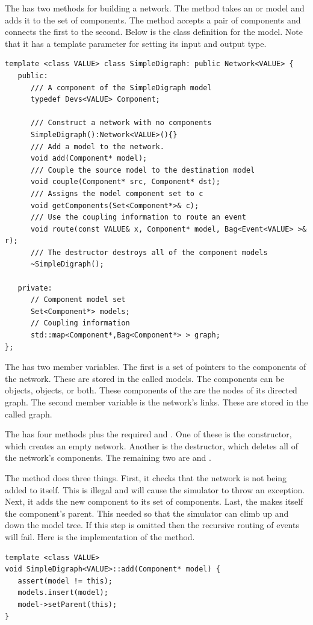 The  has two methods for building a network. The  method takes an  or  model and adds it to the set of components. The  method accepts a pair of components and connects the first to the second. Below is the class definition for the model. Note that it has a template parameter for setting its input and output type.
\begin{verbatim}
template <class VALUE> class SimpleDigraph: public Network<VALUE> {
   public:
      /// A component of the SimpleDigraph model
      typedef Devs<VALUE> Component;

      /// Construct a network with no components
      SimpleDigraph():Network<VALUE>(){}
      /// Add a model to the network.
      void add(Component* model);
      /// Couple the source model to the destination model
      void couple(Component* src, Component* dst);
      /// Assigns the model component set to c
      void getComponents(Set<Component*>& c);
      /// Use the coupling information to route an event
      void route(const VALUE& x, Component* model, Bag<Event<VALUE> >& r);
      /// The destructor destroys all of the component models
      ~SimpleDigraph();

   private:
      // Component model set
      Set<Component*> models;
      // Coupling information
      std::map<Component*,Bag<Component*> > graph;
};
\end{verbatim}
The  has two member variables. The first is a set of pointers to the components of the network. These are stored in the  called models. The components can be  objects,  objects, or both. These components of the  are the nodes of its directed graph. The second member variable is the network's links. These are stored in the  called graph.

The  has four methods plus the required  and . One of these is the constructor, which creates an empty network. Another is the destructor, which deletes all of the network's components. The remaining two are  and .

The  method does three things. First, it checks that the network is not being added to itself. This is illegal and will cause the simulator to throw an exception. Next, it adds the new component to its set of components. Last, the  makes itself the component's parent. This needed so that the simulator can climb up and down the model tree. If this step is omitted then the recursive routing of events will fail. Here is the implementation of the  method.
\begin{verbatim}
template <class VALUE>
void SimpleDigraph<VALUE>::add(Component* model) {
   assert(model != this);
   models.insert(model);
   model->setParent(this);
}
\end{verbatim}

